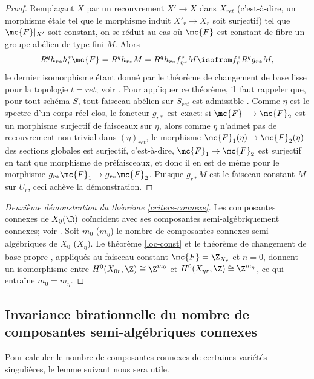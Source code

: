 \begin{proof}
Remplaçant $X$ par un recouvrement $X'\to X$ dans $X_{ret}$ (c'est-à-dire, un morphisme étale tel que le morphisme induit $X'_r\to X_r$ soit surjectif) tel que $\mc{F}|_{X'}$ soit constant, on se réduit au cas où $\mc{F}$ est constant de fibre un groupe abélien de type fini $M$. Alors\vspace*{-3pt}
\[ R^q h_{r*} h_r^* \mc{F} = R^q h_{r*} M = R^q h_{r*}f_{\eta r}^* M \isofrom f_r^* R^q g_{r*} M, \]
le dernier isomorphisme étant donné par le théorème de changement de base lisse pour la topologie $t=ret$; voir
\cite[Th.\,16.11]{scheiderer1994real}. Pour appliquer ce théorème, il~faut rappeler que, pour tout schéma $S$, tout faisceau abélien sur $S_{ret}$ est admissible \cite[Def.\,16.4.1(a)]{scheiderer1994real}. Comme $\eta$ est le spectre d'un corps réel clos, le foncteur $g_{r*}$ est exact: si $\mc{F}_1\to \mc{F}_2$ est un morphisme surjectif de faisceaux sur $\eta$, alors comme $\eta$ n'admet pas de recouvrement non trivial dans $(\eta)_{ret}$, le morphisme $\mc{F}_1(\eta)\to \mc{F}_2(\eta)$ des sections globales est surjectif, c'est-à-dire, $\mc{F}_1\to \mc{F}_2$ est surjectif en tant que morphisme de préfaisceaux, et donc il en est de même pour le morphisme $g_{r*}\mc{F}_1\to g_{r*} \mc{F}_2$. Puisque $g_{r*}M$ est le faisceau constant $M$ sur $U_r$, ceci achève la démonstration.
\end{proof}

\begin{proof}[Deuxième démonstration du théorème \ref{critere-connexe}]
Les composantes connexes de $X_0(\R)$ coïncident avec ses composantes semi-algébriquement connexes; voir \cite[Th.\,2.4.5]{bochnak1987geometrie}. Soit $m_0$ (\resp $m_\eta$) le nombre de composantes connexes semi-algébriques de $X_0$ (\resp $X_\eta$). Le théorème \ref{loc-const} et le théorème de changement de base propre \cite[Th.\,16.2 ($t=ret$)]{scheiderer1994real}, appliqués au faisceau constant $\mc{F}=\Z_{X_r}$ et $n=0$, donnent un isomorphisme entre $H^0(X_{0r},\Z)\cong \Z^{m_0}$ et $H^0(X_{\eta r},\Z)\cong\Z^{m_\eta}$, ce qui entraîne $m_0=m_\eta$.
\end{proof}

\subsection{Invariance birationnelle du nombre de composantes semi-algébriques connexes} Pour calculer le nombre de composantes connexes de certaines variétés singulières, le lemme suivant nous sera utile.

